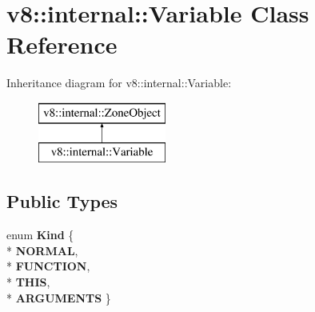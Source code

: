 \hypertarget{classv8_1_1internal_1_1_variable}{}\section{v8\+:\+:internal\+:\+:Variable Class Reference}
\label{classv8_1_1internal_1_1_variable}
Inheritance diagram for v8\+:\+:internal\+:\+:Variable\+:\begin{figure}[H]
\begin{center}
\leavevmode
\includegraphics[height=2.000000cm]{classv8_1_1internal_1_1_variable}
\end{center}
\end{figure}
\subsection*{Public Types}
\begin{DoxyCompactItemize}
\item 
enum {\bfseries Kind} \{ \\*
{\bfseries N\+O\+R\+M\+AL}, 
\\*
{\bfseries F\+U\+N\+C\+T\+I\+ON}, 
\\*
{\bfseries T\+H\+IS}, 
\\*
{\bfseries A\+R\+G\+U\+M\+E\+N\+TS}
 \}\hypertarget{classv8_1_1internal_1_1_variable_a8d63c9319e6a17201b7c3585b5c09a45}{}\label{classv8_1_1internal_1_1_variable_a8d63c9319e6a17201b7c3585b5c09a45}

\end{DoxyCompactItemize}
